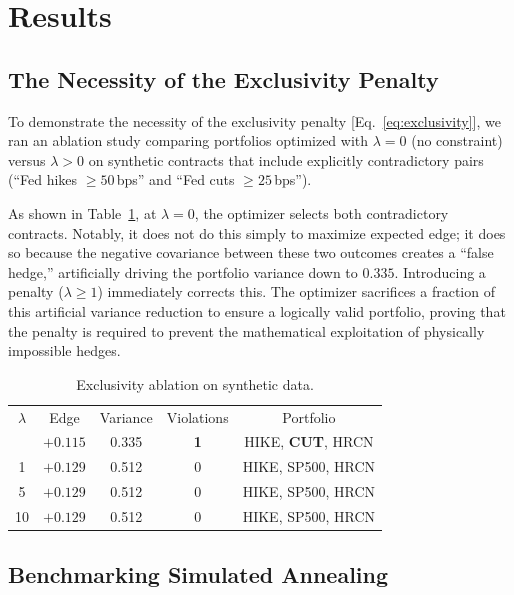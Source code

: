 \documentclass[aps, reprint, prl, twocolumn, superscriptaddress,amsmath,amssymb,noeprint]{revtex4-2}
\begin{document}
\section{Results}

\subsection{The Necessity of the Exclusivity Penalty}

To demonstrate the necessity of the exclusivity penalty [Eq.~\eqref{eq:exclusivity}], we ran an ablation study comparing portfolios optimized with $\lambda = 0$ (no constraint) versus $\lambda > 0$ on synthetic contracts that include explicitly contradictory pairs (``Fed hikes $\geq 50$\,bps'' and ``Fed cuts $\geq 25$\,bps'').

As shown in Table~\ref{tab:ablation}, at $\lambda = 0$, the optimizer selects both contradictory contracts. Notably, it does not do this simply to maximize expected edge; it does so because the negative covariance between these two outcomes creates a ``false hedge,'' artificially driving the portfolio variance down to $0.335$. Introducing a penalty ($\lambda \ge 1$) immediately corrects this. The optimizer sacrifices a fraction of this artificial variance reduction to ensure a logically valid portfolio, proving that the penalty is required to prevent the mathematical exploitation of physically impossible hedges.

\begin{table}[H]
\caption{\label{tab:ablation}Exclusivity ablation on synthetic data.}
\begin{ruledtabular}
\begin{tabular}{ccccc}
$\lambda$ & Edge & Variance & Violations & Portfolio \\
\colrule
0   & $+0.115$ & 0.335 & \textbf{1} & HIKE, \textbf{CUT}, HRCN \\
1   & $+0.129$ & 0.512 & 0 & HIKE, SP500, HRCN \\
5   & $+0.129$ & 0.512 & 0 & HIKE, SP500, HRCN \\
10  & $+0.129$ & 0.512 & 0 & HIKE, SP500, HRCN \\
\end{tabular}
\end{ruledtabular}
\end{table}

\subsection{Benchmarking Simulated Annealing}
\end{document}
